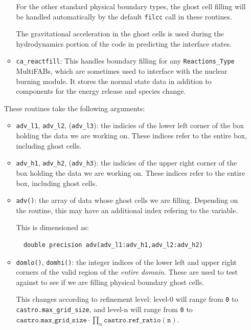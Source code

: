 \begin{itemize}
\begin{itemize}
    For the other standard physical boundary types, the ghost cell
    filling will be handled automatically by the default {\tt filcc}
    call in these routines.

    The gravitational acceleration in the ghost cells is used during
    the hydrodynamics portion of the code in predicting the
    interface states.

  \item {\tt ca\_reactfill}: This handles boundary filling for
    any {\tt Reactions\_Type} MultiFABs, which are sometimes used to interface
    with the nuclear burning module. It stores the normal state data
    in addition to components for the energy release and species change.

  \end{itemize}

  These routines take the following arguments:
  \begin{itemize}
  \item {\tt adv\_l1}, {\tt adv\_l2}, ({\tt adv\_l3}): the indicies of
    the lower left corner of the box holding the data we are working on.
    These indices refer to the entire box, including ghost cells.

  \item {\tt adv\_h1}, {\tt adv\_h2}, ({\tt adv\_h3}): the indicies of
    the upper right corner of the box holding the data we are working on.
    These indices refer to the entire box, including ghost cells.

  \item {\tt adv()}: the array of data whose ghost cells we are filling.
    Depending on the routine, this may have an additional index refering
    to the variable.

    This is dimensioned as:
\begin{verbatim}
  double precision adv(adv_l1:adv_h1,adv_l2:adv_h2)
\end{verbatim}

  \item {\tt domlo()}, {\tt domhi()}: the integer indices of the lower
    left and upper right corners of the valid region of the {\em entire
    domain}.  These are used to test against to see if we are filling
    physical boundary ghost cells.

    This changes according to refinement level: level-0 will
    range from {\tt 0} to {\tt castro.max\_grid\_size},
    and level-n will range from {\tt 0} to
    $\mathtt{castro.max\_grid\_size} \cdot \prod_n \mathtt{castro.ref\_ratio(n)}$.


\end{itemize}
\end{itemize}
